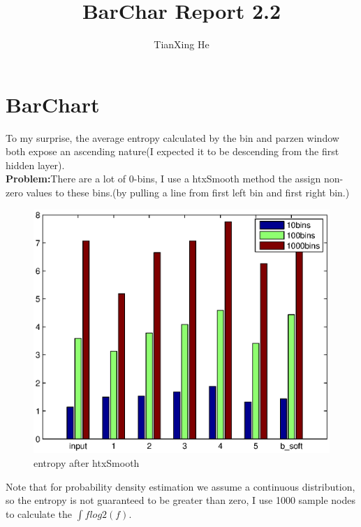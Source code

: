 \documentclass[11pt]{article}
\title{\textbf{BarChar Report 2.2}}
\author{TianXing He}
\date{}
\begin{document}
\maketitle
\section{BarChart}
To my surprise, the average entropy calculated by the bin and parzen window both expose an ascending nature(I expected it to be descending from the first hidden layer).\\
\textbf{Problem:}There are a lot of 0-bins, I use a htxSmooth method the assign non-zero values to these bins.(by pulling a line from first left bin and first right bin.)
\begin{figure}[H]
\centering
\includegraphics[scale=0.80]{figs/htxSmoothedEntropy.eps}
\caption{entropy after htxSmooth}
\end{figure}
Note that for probability density estimation we assume a continuous distribution, so the entropy is not guaranteed to be greater than zero, I use 1000 sample nodes to calculate the $\int f log2(f) $.
\end{document}
